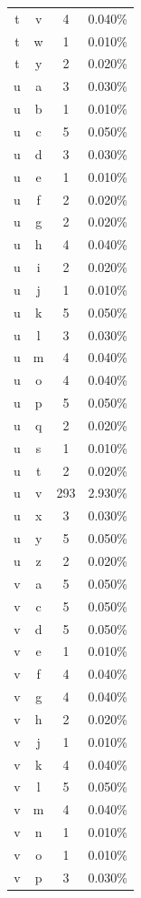 \begin{longtable}{cccc}
    t & v & 4 & 0.040\% \\
    t & w & 1 & 0.010\% \\
    t & y & 2 & 0.020\% \\
    u & a & 3 & 0.030\% \\
    u & b & 1 & 0.010\% \\
    u & c & 5 & 0.050\% \\
    u & d & 3 & 0.030\% \\
    u & e & 1 & 0.010\% \\
    u & f & 2 & 0.020\% \\
    u & g & 2 & 0.020\% \\
    u & h & 4 & 0.040\% \\
    u & i & 2 & 0.020\% \\
    u & j & 1 & 0.010\% \\
    u & k & 5 & 0.050\% \\
    u & l & 3 & 0.030\% \\
    u & m & 4 & 0.040\% \\
    u & o & 4 & 0.040\% \\
    u & p & 5 & 0.050\% \\
    u & q & 2 & 0.020\% \\
    u & s & 1 & 0.010\% \\
    u & t & 2 & 0.020\% \\
    u & v & 293 & 2.930\% \\
    u & x & 3 & 0.030\% \\
    u & y & 5 & 0.050\% \\
    u & z & 2 & 0.020\% \\
    v & a & 5 & 0.050\% \\
    v & c & 5 & 0.050\% \\
    v & d & 5 & 0.050\% \\
    v & e & 1 & 0.010\% \\
    v & f & 4 & 0.040\% \\
    v & g & 4 & 0.040\% \\
    v & h & 2 & 0.020\% \\
    v & j & 1 & 0.010\% \\
    v & k & 4 & 0.040\% \\
    v & l & 5 & 0.050\% \\
    v & m & 4 & 0.040\% \\
    v & n & 1 & 0.010\% \\
    v & o & 1 & 0.010\% \\
    v & p & 3 & 0.030\% \\

\end{longtable}
